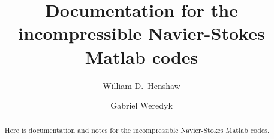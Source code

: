 \documentclass[preprint,10pt]{elsarticle}
\begin{document}
\begin{frontmatter}
 \title{Documentation for the incompressible Navier-Stokes Matlab codes}





\author[rpi]{William D.~Henshaw}


\author[rpi]{Gabriel Weredyk}


\address[rpi]{Department of Mathematical Sciences, Rensselaer Polytechnic Institute, Troy, NY 12180, USA}







\begin{abstract}

  Here is documentation and notes for the incompressible Navier-Stokes Matlab codes.


\end{abstract}

\end{frontmatter}


\tableofcontents

%  


\newcommand{\Vdot}{\dot{V}}
\newcommand{\lambdaHat}{\hat{\lambda}}



\end{document}
